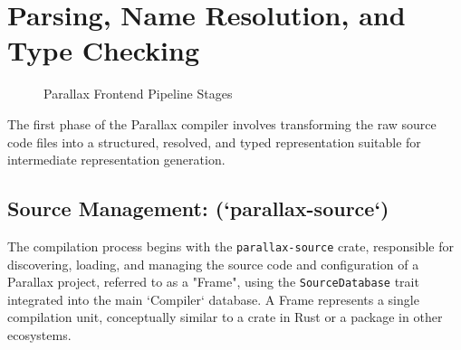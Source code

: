 \section{Parsing, Name Resolution, and Type Checking}
\begin{figure}[h!]
    \centering
    \caption{Parallax Frontend Pipeline Stages}
    \label{fig:impl_pipeline}
\end{figure}

The first phase of the Parallax compiler involves transforming the raw source code files into a structured, resolved, and typed representation suitable for intermediate representation generation.

\subsection{Source Management: (`parallax-source`)}

The compilation process begins with the \texttt{parallax-source} crate, responsible for discovering, loading, and managing the source code and configuration of a Parallax project, referred to as a "Frame", using the \texttt{SourceDatabase} trait integrated into the main `Compiler` database. A Frame represents a single compilation unit, conceptually similar to a crate in Rust or a package in other ecosystems.

